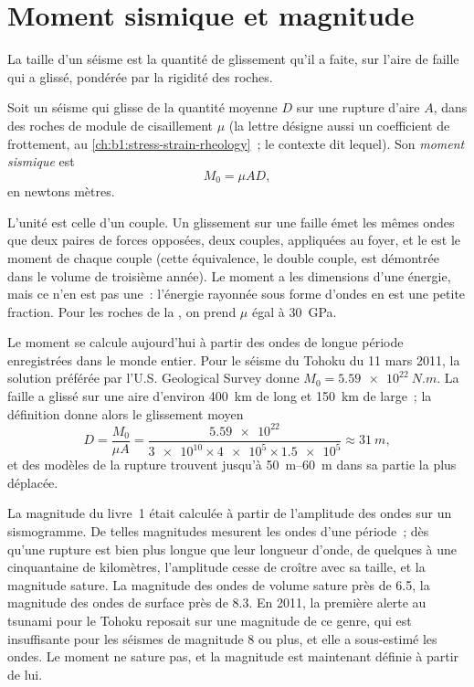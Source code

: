 \section{Moment sismique et magnitude}\label{sec:b1:earthquake-source:moment}

La taille d'un séisme est la quantité de glissement qu'il a faite, sur l'aire de
faille qui a glissé, pondérée par la rigidité des roches.

\begin{definition}\label{def:b1:earthquake-source:moment}
Soit un séisme qui glisse de la quantité moyenne $D$ sur une rupture d'aire $A$,
dans des roches de module de cisaillement $\mu$ (la lettre désigne aussi un coefficient de frottement,
au \cref{ch:b1:stress-strain-rheology}~; le contexte dit lequel). Son \emph{moment sismique} est
\[
  M_0 = \mu A D ,
\]
en newtons mètres.
\end{definition}

L'unité est celle d'un couple. Un glissement sur une faille émet les mêmes ondes que deux
paires de forces opposées, deux couples, appliquées au foyer, et le  est le moment de chaque couple (cette équivalence, le double couple, est
démontrée dans le volume de troisième année). Le moment a les dimensions d'une énergie, mais
ce n'en est pas une~: l'énergie rayonnée sous forme d'ondes en est une petite fraction. Pour les
roches de la , on prend $\mu$ égal à \qty{30}{GPa}.

Le moment se calcule aujourd'hui à partir des ondes de longue période enregistrées dans le
monde entier. Pour le séisme du Tohoku du 11 mars 2011, la solution préférée par
l'U.S. Geological Survey donne $M_0 = \qty{5.59e22}{N.m}$. La faille a glissé
sur une aire d'environ \qty{400}{km} de long et \qty{150}{km} de large~; la définition
donne alors le glissement moyen
\[
  D = \frac{M_0}{\mu A}
    = \frac{\num{5.59e22}}{\num{3e10}\times\num{4e5}\times\num{1.5e5}}
    \approx \qty{31}{m} ,
\]
et des modèles de la rupture trouvent jusqu'à \qtyrange{50}{60}{m} dans sa partie la plus
déplacée.

La magnitude du livre~1 était calculée à partir de l'amplitude des ondes sur un
sismogramme. De telles magnitudes mesurent les ondes d'une période~; dès qu'une rupture est
bien plus longue que leur longueur d'onde, de quelques à une cinquantaine de kilomètres,
l'amplitude cesse de croître avec sa taille, et la magnitude sature. La
magnitude des ondes de volume sature près de 6.5, la magnitude des ondes de surface près de 8.3.
En 2011, la première alerte au tsunami pour le Tohoku reposait sur une magnitude de ce
genre, qui est insuffisante pour les séismes de magnitude 8 ou plus, et elle
a sous-estimé les ondes. Le moment ne sature pas, et la magnitude est
maintenant définie à partir de lui.

